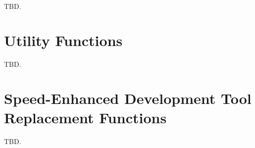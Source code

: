 TBD.

\section{Utility Functions}
\label{cfrf2:snef2}

TBD.

\section{Speed-Enhanced Development Tool Replacement Functions}
\label{cfrf2:ssef2}

TBD.



